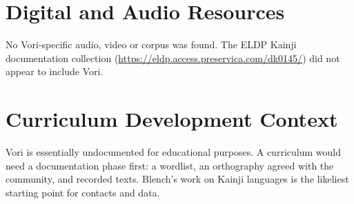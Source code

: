 \documentclass[12pt]{article}
\begin{document}
\section{Digital and Audio Resources}
No Vori-specific audio, video or corpus was found. The ELDP Kainji documentation collection (\url{https://eldp.access.preservica.com/dk0145/}) did not appear to include Vori.

\section{Curriculum Development Context}
Vori is essentially undocumented for educational purposes. A curriculum would need a documentation phase first: a wordlist, an orthography agreed with the community, and recorded texts. Blench's work on Kainji languages is the likeliest starting point for contacts and data.
\end{document}
